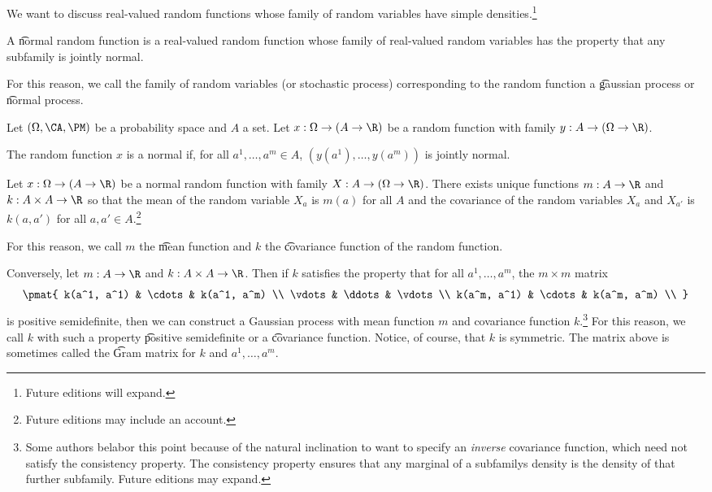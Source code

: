 

We want to discuss real-valued random functions whose family of random variables have simple densities.\footnote{Future editions will expand.}


A \t{normal random function} is a real-valued random function whose family of real-valued random variables has the property that any subfamily is jointly normal.

For this reason, we call the family of random variables (or stochastic process) corresponding to the random function a \t{gaussian process} or \t{normal process}.


Let $(\Omega, \CA, \PM)$ be a probability space and $A$ a set.
Let $x: \Omega \to (A \to \R)$ be a random function with family $y: A \to (\Omega \to \R)$.

The random function $x$ is a normal if, for all $a^1, \dots, a^m \in A$, $(y(a^1), \dots, y(a^m))$ is jointly normal.


\begin{proposition}
  Let $x: \Omega \to (A \to \R)$ be a normal random function with family $X: A \to (\Omega \to \R)$.
  There exists unique functions $m: A \to \R$ and $k: A \times A \to \R$ so that the mean of the random variable $X_a$ is $m(a)$ for all $A$ and the covariance of the random variables $X_a$ and $X_{a'}$ is $k(a, a')$ for all $a, a' \in A$.\footnote{Future editions may include an account.}
\end{proposition}
For this reason, we call $m$ the \t{mean function} and $k$ the \t{covariance function} of the random function.

Conversely, let $m: A \to \R$ and $k: A \times A \to \R$.
Then if $k$ satisfies the property that for all $a^1, \dots, a^m$, the $m \times m$ matrix
\[
  \pmat{
    k(a^1, a^1) & \cdots & k(a^1, a^m) \\
    \vdots & \ddots & \vdots \\
    k(a^m, a^1) & \cdots & k(a^m, a^m) \\
  }
\]
is positive semidefinite, then we can construct a Gaussian process with mean function $m$ and covariance function $k$.\footnote{Some authors belabor this point because of the natural inclination to want to specify an \textit{inverse} covariance function, which need not satisfy the consistency property.  The consistency property ensures that any marginal of a subfamilys density is the density of that further subfamily. Future editions may expand.}
For this reason, we call $k$ with such a property \t{positive semidefinite} or a \t{covariance function}.
Notice, of course, that $k$ is symmetric.
The matrix above is sometimes called the \t{Gram matrix} for $k$ and $a^1, \dots, a^m$.

